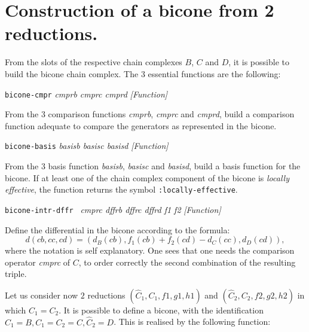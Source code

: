 \section {Construction of a bicone from 2 reductions.}

From the slots of the respective chain complexes $B$, $C$ and $D$, it is possible to 
build the bicone chain complex. The $3$ essential functions are the following:
\vskip 0.45cm
{\parindent=0mm
{\leftskip=5mm 
{\tt bicone-cmpr} {\em cmprb cmprc cmprd} \hfill {\em [Function]} \par}
{\leftskip=15mm 
From the $3$ comparison functions {\em cmprb}, {\em cmprc} and {\em cmprd}, build a
comparison function adequate to compare the generators as represented in the bicone. \par}
{\leftskip=5mm 
{\tt bicone-basis} {\em basisb basisc basisd} \hfill {\em [Function]} \par}
{\leftskip=15mm 
From the $3$ basis function {\em basisb}, {\em basisc} and {\em basisd}, build a
basis function for the bicone. If at least one of the chain complex component of
the bicone is {\em locally effective}, the function returns the symbol {\tt :locally-effective}. \par}
{\leftskip=5mm 
{\tt bicone-intr-dffr } {\em cmprc dffrb dffrc dffrd f1 f2} \hfill {\em [Function]} \par}
{\leftskip=15mm 
Define the differential in the bicone according to the formula:
$$d(cb, cc, cd)= (d_B(cb), f_1(cb) + f_2(cd) - d_C(cc), d_D(cd)),$$
where the notation is self explanatory. One sees that one needs the comparison operator
{\em cmprc} of $C$, to order correctly the second combination of the resulting triple. \par}
}
\vskip 0.35cm
Let us consider now $2$ reductions $(\hat C_1, C_1, f1, g1, h1)$ and $(\hat C_2, C_2, f2, g2, h2)$
in which $C_1 = C_2$. It is possible to define a bicone, with the identification
$\hat C_1=B, C_1=C_2=C, \hat C_2=D$. This is realised by the  following function:
\vskip 0.35cm
